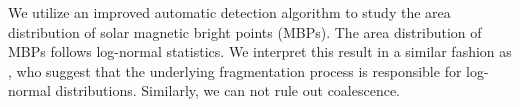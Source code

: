 \documentclass{emulateapj}
\begin{document}
We utilize an improved automatic detection algorithm to study the area distribution of solar magnetic bright points (MBPs). 
The area distribution of MBPs follows log-normal statistics. We interpret this result in a similar fashion as \cite{Bog88}, who suggest that the  underlying fragmentation process is responsible for log-normal distributions.  Similarly, we can not rule out coalescence.



\end{document}
